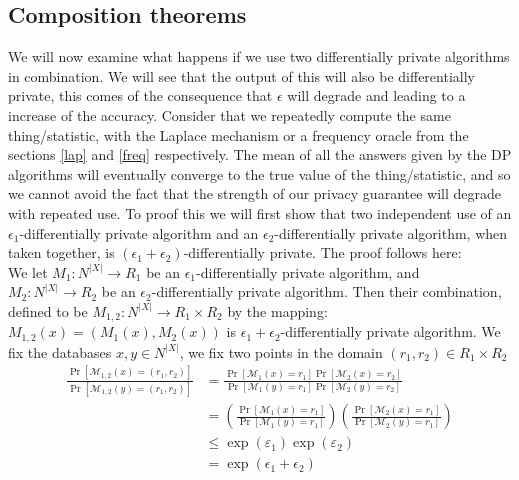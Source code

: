 \documentclass[11pt]{article}
\theoremstyle{definition}
\begin{document}
\subsection{Composition theorems}
We will now examine what happens if we use two differentially private algorithms in combination. We will see that the output of this will also be differentially private, this comes of the consequence that $\epsilon$ will degrade and leading to a increase of the accuracy. Consider that we repeatedly compute the same thing/statistic, with the Laplace mechanism or a frequency oracle from the sections \ref{lap} and \ref{freq} respectively. The mean of all the answers given by the DP algorithms will eventually converge to the true value of the thing/statistic, and so we cannot avoid the fact that the strength of our privacy guarantee will degrade with repeated use. To proof this we will first show that two independent use of an $\epsilon_1$-differentially private algorithm and an $\epsilon_2$-differentially private algorithm, when taken together, is $(\epsilon_1+\epsilon_2)$-differentially private. The proof follows here: \\
We let $M_1:N^{|X|} \rightarrow R_1$ be an $\epsilon_1$-differentially private algorithm, and $M_2:N^{|X|} \rightarrow R_2$ be an $\epsilon_2$-differentially private algorithm. Then their combination, defined to be $M_{1,2}:N^{|X|}\rightarrow R_1\times R_2$ by the mapping: $M_{1,2}(x) = (M_1(x),M_2(x))$ is  $\epsilon_1+\epsilon_2$-differentially private algorithm. We fix the databases $x,y \in N^{|X|}$, we fix two points in the domain $(r_1,r_2)\in R_1\times R_2$
\begin{align*}
    \frac{\operatorname{Pr}\left[\mathcal{M}_{1,2}(x)=\left(r_{1}, r_{2}\right)\right]}{\operatorname{Pr}\left[\mathcal{M}_{1,2}(y)=\left(r_{1}, r_{2}\right)\right]} &=\frac{\operatorname{Pr}\left[\mathcal{M}_{1}(x)=r_{1}\right] \operatorname{Pr}\left[\mathcal{M}_{2}(x)=r_{2}\right]}{\operatorname{Pr}\left[\mathcal{M}_{1}(y)=r_{1}\right] \operatorname{Pr}\left[\mathcal{M}_{2}(y)=r_{2}\right]} \\
&=\left(\frac{\operatorname{Pr}\left[\mathcal{M}_{1}(x)=r_{1}\right]}{\operatorname{Pr}\left[\mathcal{M}_{1}(y)=r_{1}\right]}\right)\left(\frac{\operatorname{Pr}\left[\mathcal{M}_{2}(x)=r_{1}\right]}{\operatorname{Pr}\left[\mathcal{M}_{2}(y)=r_{1}\right]}\right) \\
& \leq \exp \left(\varepsilon_{1}\right) \exp \left(\varepsilon_{2}\right) \\
&=\exp \left(\epsilon_{1}+\epsilon_{2}\right)
\end{align*} \\
\end{document}
